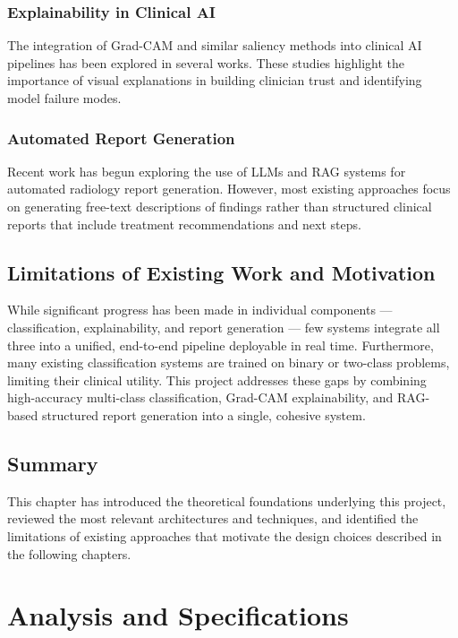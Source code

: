 \documentclass[12pt]{report}
\begin{document}
\subsection{Explainability in Clinical AI}
The integration of Grad-CAM and similar saliency methods into clinical
AI pipelines has been explored in several works. These studies highlight
the importance of visual explanations in building clinician trust and
identifying model failure modes.

\subsection{Automated Report Generation}
Recent work has begun exploring the use of LLMs and RAG systems for
automated radiology report generation. However, most existing approaches
focus on generating free-text descriptions of findings rather than
structured clinical reports that include treatment recommendations and
next steps.

\section{Limitations of Existing Work and Motivation}
While significant progress has been made in individual components ---
classification, explainability, and report generation --- few systems
integrate all three into a unified, end-to-end pipeline deployable in
real time. Furthermore, many existing classification systems are trained
on binary or two-class problems, limiting their clinical utility. This
project addresses these gaps by combining high-accuracy multi-class
classification, Grad-CAM explainability, and RAG-based structured report
generation into a single, cohesive system.

\section{Summary}
This chapter has introduced the theoretical foundations underlying this
project, reviewed the most relevant architectures and techniques, and
identified the limitations of existing approaches that motivate the
design choices described in the following chapters.


\chapter{Analysis and Specifications}
\end{document}

